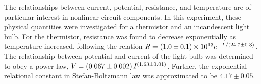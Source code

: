 
\physics

\begin{paperabs}
	
	
	The relationships between current, potential, resistance, and temperature are of particular interest in nonlinear circuit components. In this experiment, these physical quantities were investigated for a thermistor and an incandescent light bulb. For the thermistor, resistance was found to decrease exponentially as temperature increased, following the relation \( R = \left(1.0 \pm 0.1\right) \times 10^{13}e^{-T/\left(24.7 \pm 0.3\right)} \). The relationship between potential and current of the light bulb was determined to obey a power law, \( V = \left(0.067 \pm 0.002\right) I^{\left(1.63 \pm 0.01\right)} \). Further, the exponential relational constant in Stefan-Boltzmann law was approximated to be \( 4.17 \pm 0.05 \). 
	
\end{paperabs}

